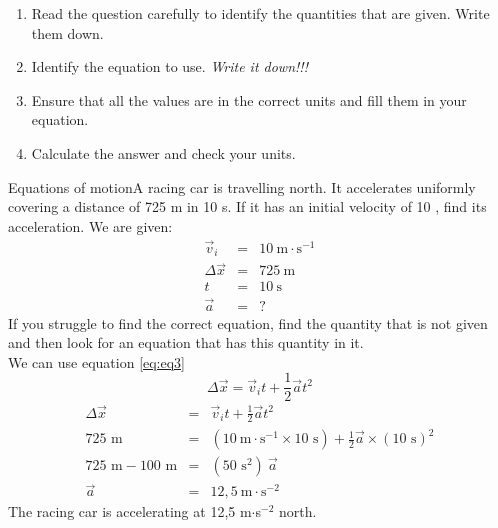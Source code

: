      \label{m38796*id76133}\begin{enumerate}[noitemsep, label=\textbf{\arabic*}. ] 
            \label{m38796*uid130}\item Read the question carefully to identify the quantities that are given. Write them down.
\label{m38796*uid131}\item Identify the equation to use. \textsl{Write it down!!!}\label{m38796*uid132}\item Ensure that all the values are in the correct units and fill them in your equation.
\label{m38796*uid133}\item Calculate the answer and check your units.
\end{enumerate}
	\par
      \label{m38796*uid134}
            
\begin{wex}{Equations of motion}{A racing car is travelling north. It accelerates uniformly  covering a distance of 725 m in 10 s. If it has an initial velocity of 10 \ms, find its acceleration.}
{ We are given:
\begin{eqnarray*}
\vec{v}_i&=&10\ \text{m} \cdot \text{s}^{-1}\\
\Delta \vec{x}&=&725\ \text{m}\\
t&=&10\ \text{s}\\
\vec{a}&=&?
\end{eqnarray*}
If you struggle to find the correct equation, find the quantity that is not given and then look for an equation that has this quantity in it.\\
We can use equation \ref{eq:eq3}
\begin{displaymath}
\Delta \vec{x}=\vec{v}_it +\frac{1}{2}\vec{a}t^2
\end{displaymath}
\begin{eqnarray*}
\Delta \vec{x} &=& \vec{v}_it +\frac{1}{2}\vec{a}t^2\\
725\text{~m} &=& (10~\text{m}\cdot \text{s}^{-1} \times 10\text{~s}) + \frac{1}{2} \vec{a} \times (10\text{~s})^2\\
725\text{~m} - 100\text{~m} &=& (50\text{~s}^2)~ \vec{a}\\
\vec{a} &=& 12,5~ \text{m} \cdot\text{s}^{-2}
\end{eqnarray*}
The racing car is accelerating at 12,5 m$\cdot$s$^{-2}$ north.}
\end{wex}

